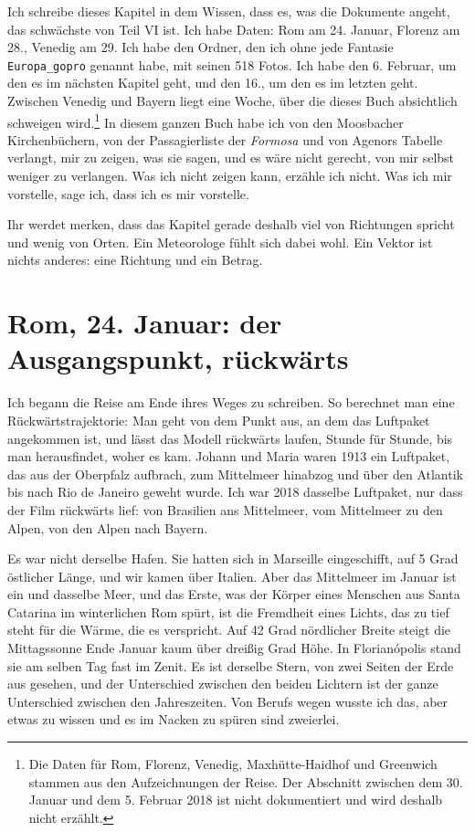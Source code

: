 \documentclass[
  ngerman,
  11pt,
  openany]{book}
\begin{document}
Ich schreibe dieses Kapitel in dem Wissen, dass es, was die Dokumente
angeht, das schwächste von Teil VI ist. Ich habe Daten: Rom am 24.
Januar, Florenz am 28., Venedig am 29. Ich habe den Ordner, den ich ohne
jede Fantasie \texttt{Europa\_gopro} genannt habe, mit seinen 518 Fotos.
Ich habe den 6. Februar, um den es im nächsten Kapitel geht, und den
16., um den es im letzten geht. Zwischen Venedig und Bayern liegt eine
Woche, über die dieses Buch absichtlich schweigen wird.\footnote{Die
  Daten für Rom, Florenz, Venedig, Maxhütte-Haidhof und Greenwich
  stammen aus den Aufzeichnungen der Reise. Der Abschnitt zwischen dem
  30. Januar und dem 5. Februar 2018 ist nicht dokumentiert und wird
  deshalb nicht erzählt.} In diesem ganzen Buch habe ich von den
Moosbacher Kirchenbüchern, von der Passagierliste der \emph{Formosa} und
von Agenors Tabelle verlangt, mir zu zeigen, was sie sagen, und es wäre
nicht gerecht, von mir selbst weniger zu verlangen. Was ich nicht zeigen
kann, erzähle ich nicht. Was ich mir vorstelle, sage ich, dass ich es
mir vorstelle.

Ihr werdet merken, dass das Kapitel gerade deshalb viel von Richtungen
spricht und wenig von Orten. Ein Meteorologe fühlt sich dabei wohl. Ein
Vektor ist nichts anderes: eine Richtung und ein Betrag.

\section{Rom, 24. Januar: der Ausgangspunkt,
rückwärts}\label{rom-24.-januar-der-ausgangspunkt-ruxfcckwuxe4rts}

Ich begann die Reise am Ende ihres Weges zu schreiben. So berechnet man
eine Rückwärtstrajektorie: Man geht von dem Punkt aus, an dem das
Luftpaket angekommen ist, und lässt das Modell rückwärts laufen, Stunde
für Stunde, bis man herausfindet, woher es kam. Johann und Maria waren
1913 ein Luftpaket, das aus der Oberpfalz aufbrach, zum Mittelmeer
hinabzog und über den Atlantik bis nach Rio de Janeiro geweht wurde. Ich
war 2018 dasselbe Luftpaket, nur dass der Film rückwärts lief: von
Brasilien ans Mittelmeer, vom Mittelmeer zu den Alpen, von den Alpen
nach Bayern.

Es war nicht derselbe Hafen. Sie hatten sich in Marseille eingeschifft,
auf 5 Grad östlicher Länge, und wir kamen über Italien. Aber das
Mittelmeer im Januar ist ein und dasselbe Meer, und das Erste, was der
Körper eines Menschen aus Santa Catarina im winterlichen Rom spürt, ist
die Fremdheit eines Lichts, das zu tief steht für die Wärme, die es
verspricht. Auf 42 Grad nördlicher Breite steigt die Mittagssonne Ende
Januar kaum über dreißig Grad Höhe. In Florianópolis stand sie am selben
Tag fast im Zenit. Es ist derselbe Stern, von zwei Seiten der Erde aus
gesehen, und der Unterschied zwischen den beiden Lichtern ist der ganze
Unterschied zwischen den Jahreszeiten. Von Berufs wegen wusste ich das,
aber etwas zu wissen und es im Nacken zu spüren sind zweierlei.
\end{document}
